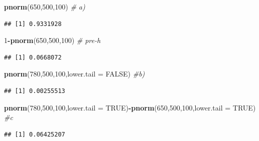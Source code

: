 \documentclass[
]{article}
\newenvironment{Shaded}{\begin{snugshade}}{\end{snugshade}}
\newcommand{\AttributeTok}[1]{\textcolor[rgb]{0.13,0.29,0.53}{#1}}
\newcommand{\CommentTok}[1]{\textcolor[rgb]{0.56,0.35,0.01}{\textit{#1}}}
\newcommand{\ConstantTok}[1]{\textcolor[rgb]{0.56,0.35,0.01}{#1}}
\newcommand{\DecValTok}[1]{\textcolor[rgb]{0.00,0.00,0.81}{#1}}
\newcommand{\FunctionTok}[1]{\textcolor[rgb]{0.13,0.29,0.53}{\textbf{#1}}}
\newcommand{\NormalTok}[1]{#1}
\newcommand{\SpecialCharTok}[1]{\textcolor[rgb]{0.81,0.36,0.00}{\textbf{#1}}}
\begin{document}
\begin{Shaded}
\begin{Highlighting}[]
\FunctionTok{pnorm}\NormalTok{(}\DecValTok{650}\NormalTok{,}\DecValTok{500}\NormalTok{,}\DecValTok{100}\NormalTok{) }\CommentTok{\# a)}
\end{Highlighting}
\end{Shaded}

\begin{verbatim}
## [1] 0.9331928
\end{verbatim}

\begin{Shaded}
\begin{Highlighting}[]
\DecValTok{1}\SpecialCharTok{{-}}\FunctionTok{pnorm}\NormalTok{(}\DecValTok{650}\NormalTok{,}\DecValTok{500}\NormalTok{,}\DecValTok{100}\NormalTok{) }\CommentTok{\# pre{-}h}
\end{Highlighting}
\end{Shaded}

\begin{verbatim}
## [1] 0.0668072
\end{verbatim}

\begin{Shaded}
\begin{Highlighting}[]
\FunctionTok{pnorm}\NormalTok{(}\DecValTok{780}\NormalTok{,}\DecValTok{500}\NormalTok{,}\DecValTok{100}\NormalTok{,}\AttributeTok{lower.tail =} \ConstantTok{FALSE}\NormalTok{) }\CommentTok{\#b)}
\end{Highlighting}
\end{Shaded}

\begin{verbatim}
## [1] 0.00255513
\end{verbatim}

\begin{Shaded}
\begin{Highlighting}[]
\FunctionTok{pnorm}\NormalTok{(}\DecValTok{780}\NormalTok{,}\DecValTok{500}\NormalTok{,}\DecValTok{100}\NormalTok{,}\AttributeTok{lower.tail =} \ConstantTok{TRUE}\NormalTok{)}\SpecialCharTok{{-}}\FunctionTok{pnorm}\NormalTok{(}\DecValTok{650}\NormalTok{,}\DecValTok{500}\NormalTok{,}\DecValTok{100}\NormalTok{,}\AttributeTok{lower.tail =} \ConstantTok{TRUE}\NormalTok{) }\CommentTok{\#c}
\end{Highlighting}
\end{Shaded}

\begin{verbatim}
## [1] 0.06425207
\end{verbatim}
\end{document}
